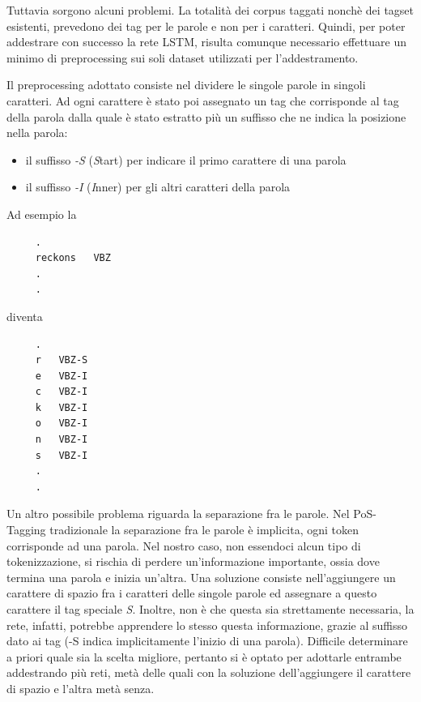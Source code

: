 Tuttavia sorgono alcuni problemi. La totalit\`a dei corpus taggati nonch\`e dei
tagset esistenti, prevedono dei tag per le parole e non per i caratteri. Quindi,
per poter addestrare con successo la rete LSTM, risulta comunque necessario
effettuare un minimo di preprocessing sui soli dataset utilizzati per l'addestramento.

Il preprocessing adottato consiste nel dividere le singole parole in singoli
caratteri. Ad ogni carattere \`e stato poi assegnato un tag che corrisponde al
tag della parola dalla quale \`e stato estratto pi\`u un suffisso che ne indica
la posizione nella parola:

\begin{itemize}
  \item il suffisso \emph{-S} (\emph{S}tart) per indicare il primo carattere di
        una parola
  \item il suffisso \emph{-I} (\emph{I}nner) per gli altri caratteri della parola
\end{itemize}

Ad esempio la

\begin{center}
  \begin{minipage}{5cm}
    \begin{verbatim}
     .
     reckons   VBZ
     .
     .
    \end{verbatim}
  \end{minipage}
\end{center}

diventa

\begin{center}
  \begin{minipage}{5cm}
    \begin{verbatim}
     .
     r   VBZ-S
     e   VBZ-I
     c   VBZ-I
     k   VBZ-I
     o   VBZ-I
     n   VBZ-I
     s   VBZ-I
     .
     .
    \end{verbatim}
  \end{minipage}
\end{center}

Un altro possibile problema riguarda la separazione fra le parole.
Nel PoS-Tagging tradizionale la separazione fra le parole \`e implicita, ogni
token corrisponde ad una parola. Nel nostro caso, non essendoci alcun tipo di
tokenizzazione, si rischia di perdere un'informazione importante, ossia dove
termina una parola e inizia un'altra. Una soluzione consiste nell'aggiungere un
carattere di spazio fra i caratteri delle singole parole ed assegnare a questo
carattere il tag speciale \emph{S}. Inoltre, non \`e che questa sia strettamente
necessaria, la rete, infatti, potrebbe apprendere lo stesso questa informazione,
grazie al suffisso dato ai tag (-S indica implicitamente l'inizio di una parola).
Difficile determinare a priori quale sia la scelta migliore, pertanto si \`e optato
per adottarle entrambe addestrando pi\`u reti, met\`a delle quali con la soluzione
dell'aggiungere il carattere di spazio e l'altra met\`a senza.

